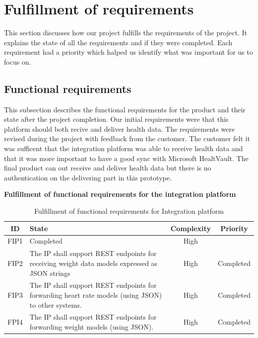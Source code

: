 \section{Fulfillment of requirements}

This section discusses how our project fulfills the requirements of the project. 
It explains the state of all the requirements and if they were completed. Each requirement had a priority which halped us identify what was important for us to focus on.

\subsection{Functional requirements}

This subsection describes the functional requirements for the product and their state after the project completion.
Our initial requirements were that this platform should both recive and deliver health data. 
The requirements were revised during the project with feedback from the customer.
The customer felt it was sufficent that the integration platform was able to receive health data and that it was more important to have a good sync with Microsoft HealtVault. 
The final product can out receive and deliver health data but there is no authentication on the delivering part in this prototype. 

\textbf{Fulfillment of functional requirements for the integration platform}

\begin{table}[H]
\begin{center}
\begin{tabular}{ | c | p{9cm} | c | c | }
  \hline
  ID & State & Complexity & Priority \\
  \hline\noalign{\smallskip}\noalign{\smallskip}\hline
  FIP1	&  Completed & High & \\
  FIP2	& The IP shall support REST endpoints for receiving weight data models expressed as JSON strings       & High & Completed \\
  FIP3	& The IP shall support REST endpoints for forwarding heart rate models (using JSON) to other systems.  & High & Completed \\
  FPI4	& The IP shall support REST endpoints for forwarding weight models (using JSON).                       & High & Completed \\
  \hline
\end{tabular}
\end{center}
\caption{Fulfillment of functional requirements for Integration platform}
\label{table:fulfillemntofrequirements}
\end{table}

